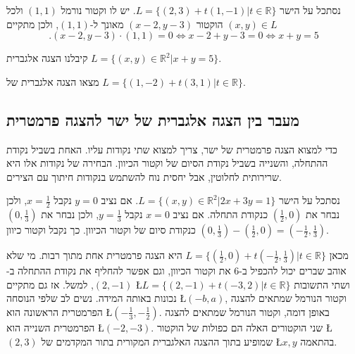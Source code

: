 \documentclass[
  hebrew,
  12pt,
  a4paper,
  oneside]{book}
\theoremstyle{definition}
\theoremstyle{remark}
\theoremstyle{plain}
\theoremstyle{remark}
\begin{document}
\begin{example}

נסתכל על הישר \(L=\{(2,3)+t(1,-1)|t\in\mathbb{R}\}\). יש לו וקטור נורמל
\((1,1)\) ולכל \((x,y)\in L\) הוקטור \((x-2,y-3)\) מאונך ל-\((1,1)\),
ולכן מתקיים \[.(x-2,y-3)\cdot(1,1)=0\iff x-2+y-3=0\iff x+y=5\]

קיבלנו הצגה אלגברית \(L=\{(x,y)\in\mathbb{R}^2|x+y=5\}\).

\end{example}

\begin{exercise}

מצאו הצגה אלגברית של \(L=\{(1,-2)+t(3,1)|t\in\mathbb{R}\}\).

\end{exercise}

\subsection{מעבר בין הצגה אלגברית של ישר להצגה
פרמטרית}\label{ux5deux5e2ux5d1ux5e8-ux5d1ux5d9ux5df-ux5d4ux5e6ux5d2ux5d4-ux5d0ux5dcux5d2ux5d1ux5e8ux5d9ux5ea-ux5e9ux5dc-ux5d9ux5e9ux5e8-ux5dcux5d4ux5e6ux5d2ux5d4-ux5e4ux5e8ux5deux5d8ux5e8ux5d9ux5ea}

כדי למצוא הצגה פרמטרית של ישר, צריך למצוא שתי נקודות עליו. האחת בשביל
נקודת ההתחלה, והשנייה בשביל נקודת הסיום של וקטור הכיוון. הבחירה של
נקודות אלו היא שרירותית לחלוטין, אבל יחסית נוח להשתמש בנקודות חיתוך עם
הצירים.

\begin{example}

נסתכל על הישר \(L=\{(x,y)\in\mathbb{R}^{2}|2x+3y=1\}\). אם נציב \(y=0\)
נקבל \(x=\frac{1}{2}\), ולכן נבחר את \((\frac{1}{2},0)\) כנקודת התחלה.
אם נציב \(x=0\) נקבל \(y=\frac{1}{3}\), ולכן נבחר את \((0,\frac{1}{3})\)
כנקודת סיום של וקטור הכיוון. כך נקבל וקטור כיוון
\((0,\frac{1}{3})-(\frac{1}{2},0)=(-\frac{1}{2},\frac{1}{3})\).

מכאן
\(L=\{(\frac{1}{2},0)+t(-\frac{1}{2},\frac{1}{3})|t\in\mathbb{R}\}\) היא
הצגה פרמטרית אחת מתוך רבות. מי שלא אוהב שברים יכול להכפיל ב-\(6\) את
וקטור הכיוון, וגם אפשר להחליף את נקודת ההתחלה ב-\((2,-1)\), למשל. אז גם
מתקיים Ł\(L=\{(2,-1)+t(-3,2)|t\in\mathbb{R}\}\) ושתי התשובות נכונות
באותה המידה. נשים לב שלפי הנוסחה Ł\((-b,a)\), וקטור הנורמל שמתאים להצגה
הפרמטרית הראשונה הוא Ł\((-\frac{1}{3},-\frac{1}{2})\). באופן דומה, וקטור
הנורמל שמתאים להצגה הפרמטרית השנייה הוא Ł\((-2,-3)\). שני הוקטורים האלה
הם כפולות של הוקטור Ł\((2,3)\) שמופיע בתוך ההצגה האלגברית המקורית בתור
המקדמים של Ł\(x,y\) בהתאמה.

\end{example}
\end{document}
